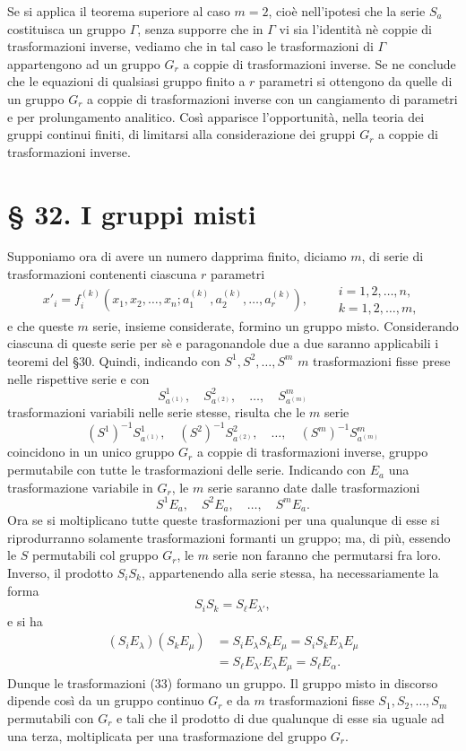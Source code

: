 \documentclass[11pt]{book}
\begin{document}
Se si applica il teorema superiore al caso $m=2$, cioè nell'ipotesi che la serie $S_a$ costituisca un gruppo $\Gamma$, senza supporre che in $\Gamma$ vi sia l'identità nè coppie di trasformazioni inverse, vediamo che in tal caso le trasformazioni di $\Gamma$ appartengono ad un gruppo $G_r$ a coppie di trasformazioni inverse. Se ne conclude che le equazioni di qualsiasi gruppo finito a $r$ parametri si ottengono da quelle di un gruppo $G_r$ a coppie di trasformazioni inverse con un cangiamento di parametri e per prolungamento analitico. Così apparisce l'opportunità, nella teoria dei gruppi continui finiti, di limitarsi alla considerazione dei gruppi $G_r$ a coppie di trasformazioni inverse.

\section*{\S{} 32. I gruppi misti}

Supponiamo ora di avere un numero dapprima finito, diciamo $m$, di serie di trasformazioni contenenti ciascuna $r$ parametri
\[
 x'_i=f_i^{(k)}(x_1,x_2,\ldots,x_n; a_1^{(k)},a_2^{(k)},\ldots,a_r^{(k)}),
 \qquad
 \begin{gathered}
 i=1,2,\ldots,n,\\
 k=1,2,\ldots,m,
 \end{gathered}
\]
e che queste $m$ serie, insieme considerate, formino un gruppo misto. Considerando ciascuna di queste serie per sè e paragonandole due a due saranno applicabili i teoremi del \S{}30. Quindi, indicando con $S^1,S^2,\ldots,S^m$ $m$ trasformazioni fisse prese nelle rispettive serie e con
\[
 S_{a^{(1)}}^1,
 \quad S_{a^{(2)}}^2,
 \quad \ldots,
 \quad S_{a^{(m)}}^m
\]
trasformazioni variabili nelle serie stesse, risulta che le $m$ serie
\[
 (S^1)^{-1}S_{a^{(1)}}^1,
 \quad (S^2)^{-1}S_{a^{(2)}}^2,
 \quad \ldots,
 \quad (S^m)^{-1}S_{a^{(m)}}^m
\]
coincidono in un unico gruppo $G_r$ a coppie di trasformazioni inverse, gruppo permutabile con tutte le trasformazioni delle serie. Indicando con $E_a$ una trasformazione variabile in $G_r$, le $m$ serie saranno date dalle trasformazioni
\begin{equation*}\tag{33}
 S^1E_a,
 \quad S^2E_a,
 \quad \ldots,
 \quad S^mE_a.
\end{equation*}
Ora se si moltiplicano tutte queste trasformazioni per una qualunque di esse si riprodurranno solamente trasformazioni formanti un gruppo; ma, di più, essendo le $S$ permutabili col gruppo $G_r$, le $m$ serie non faranno che permutarsi fra loro. Inverso, il prodotto $S_iS_k$, appartenendo alla serie stessa, ha necessariamente la forma
\[
 S_iS_k=S_\ell E_{\lambda'},
\]
e si ha
\[
\begin{split}
 (S_iE_\lambda)(S_kE_\mu)
  &=S_iE_\lambda S_kE_\mu
   =S_iS_kE_\lambda E_\mu       \\
  &=S_\ell E_{\lambda'}E_\lambda E_\mu
   =S_\ell E_\alpha.
\end{split}
\]
Dunque le trasformazioni (33) formano un gruppo. Il gruppo misto in discorso dipende così da un gruppo continuo $G_r$ e da $m$ trasformazioni fisse $S_1,S_2,\ldots,S_m$ permutabili con $G_r$ e tali che il prodotto di due qualunque di esse sia uguale ad una terza, moltiplicata per una trasformazione del gruppo $G_r$.
\end{document}
